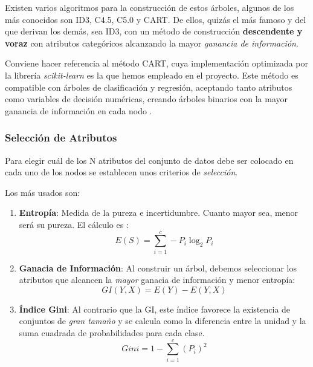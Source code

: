 Existen varios algoritmos para la construcción de estos árboles, algunos de los más conocidos son ID3, C4.5, C5.0 y CART.  
De ellos, quizás el más famoso y del que derivan los demás, sea ID3, con un método de construcción \textbf{descendente y voraz} con atributos categóricos alcanzando la mayor \textit{ganancia de información}.

Conviene hacer referencia al método CART, cuya implementación optimizada por la librería \textit{scikit-learn} es la que hemos empleado en el proyecto. Este método es compatible con árboles de clasificación y regresión, aceptando tanto atributos como variables de decisión numéricas, creando árboles binarios con la mayor ganancia de información en cada nodo \cite{Belyadi2021SupervisedLearning}.

\subsubsection{Selección de Atributos}

Para elegir cuál de los N atributos del conjunto de datos debe ser colocado en cada uno de los nodos se establecen unos criterios de \textit{selección}.

Los más usados son:

\begin{enumerate}
    \item \textbf{Entropía}: Medida de la pureza e incertidumbre. Cuanto mayor sea, menor será su pureza. El cálculo es \cite{Belyadi2021SupervisedLearning}: \begin{equation}
        E(S) = \sum_{i=1}^{c}-P_{i}\log_{2}P_{i} 
    \end{equation}
    \item \textbf{Ganacia de Información}: Al construir un árbol, debemos seleccionar los atributos que alcancen la \textit{mayor} ganacia de información y menor entropía: \begin{equation}
        GI(Y,X) = E(Y) - E(Y,X)
    \end{equation}
    \item \textbf{Índice Gini}: Al contrario que la GI, este índice favorece la existencia de conjuntos de \textit{gran tamaño} y se calcula como la diferencia entre la unidad y la suma cuadrada de probabilidades para cada clase. \begin{equation}
        Gini = 1 - \sum_{i=1}^{c}(P_{i})^2
    \end{equation}
\end{enumerate}

